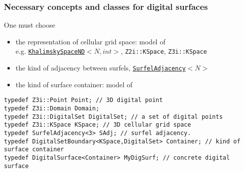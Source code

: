 \documentclass[pdftex,francais]{beamer}
\begin{document}
\begin{frame}[fragile]%
  \frametitle{Necessary concepts and classes for digital surfaces}

  \small 
  One must choose
  \begin{itemize}
  \item the representation of cellular grid space: model of
    \href{http://liris.cnrs.fr/dgtal/doc/nightly/structDGtal_1_1CCellularGridSpaceND.html}{\texttt{}}\\
    e.g. \href{http://liris.cnrs.fr/dgtal/doc/nightly/classDGtal_1_1KhalimskySpaceND.html}{\texttt{\alert{KhalimskySpaceND}$<N,int>$}}, \texttt{\alert{Z2i::KSpace}}, \texttt{\alert{Z3i::KSpace}}

  \item the kind of adjacency between surfels, \href{http://liris.cnrs.fr/dgtal/doc/nightly/classDGtal_1_1SurfelAdjacency.html}{\texttt{\alert{SurfelAdjacency}$<N>$}}

  \item the kind of surface container: model of \href{http://liris.cnrs.fr/dgtal/doc/nightly/structDGtal_1_1CDigitalSurfaceContainer.html}{\texttt{}}

  \end{itemize}
  
  \begin{lstlisting}
typedef Z3i::Point Point; // 3D digital point
typedef Z3i::Domain Domain; 
typedef Z3i::DigitalSet DigitalSet; // a set of digital points
typedef Z3i::KSpace KSpace; // 3D cellular grid space
typedef SurfelAdjacency<3> SAdj; // surfel adjacency.
typedef DigitalSetBoundary<KSpace,DigitalSet> Container; // kind of surface container
typedef DigitalSurface<Container> MyDigSurf; // concrete digital surface
  \end{lstlisting}

\end{frame}
\end{document}
